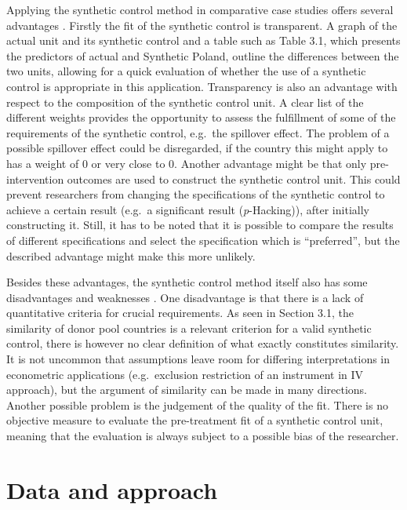 \documentclass{scrbook}
\begin{document}
Applying the synthetic control method in comparative case studies offers
several advantages \parencite{abadie_using_2021}. Firstly the fit of the
synthetic control is transparent. A graph of the actual unit and its
synthetic control and a table such as Table 3.1, which presents the
predictors of actual and Synthetic Poland, outline the differences
between the two units, allowing for a quick evaluation of whether the
use of a synthetic control is appropriate in this application.
Transparency is also an advantage with respect to the composition of the
synthetic control unit. A clear list of the different weights provides
the opportunity to assess the fulfillment of some of the requirements of
the synthetic control, e.g.~the spillover effect. The problem of a
possible spillover effect could be disregarded, if the country this
might apply to has a weight of 0 or very close to 0. Another advantage
might be that only pre-intervention outcomes are used to construct the
synthetic control unit. This could prevent researchers from changing the
specifications of the synthetic control to achieve a certain result
(e.g.~a significant result (\textit{p}-Hacking)), after initially
constructing it. Still, it has to be noted that it is possible to
compare the results of different specifications and select the
specification which is ``preferred'', but the described advantage might
make this more unlikely.

Besides these advantages, the synthetic control method itself also has
some disadvantages and weaknesses \parencite{bouttell_synthetic_2018}.
One disadvantage is that there is a lack of quantitative criteria for
crucial requirements. As seen in Section 3.1, the similarity of donor
pool countries is a relevant criterion for a valid synthetic control,
there is however no clear definition of what exactly constitutes
similarity. It is not uncommon that assumptions leave room for differing
interpretations in econometric applications (e.g.~exclusion restriction
of an instrument in IV approach), but the argument of similarity can be
made in many directions. Another possible problem is the judgement of
the quality of the fit. There is no objective measure to evaluate the
pre-treatment fit of a synthetic control unit, meaning that the
evaluation is always subject to a possible bias of the researcher.

\section{Data and approach}
\end{document}
